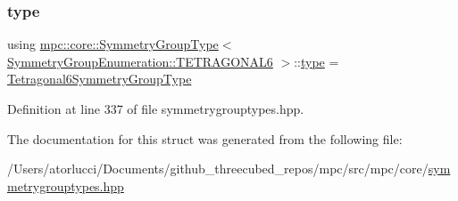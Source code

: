 \subsubsection{\texorpdfstring{type}{type}}
{\footnotesize\ttfamily using \mbox{\hyperlink{structmpc_1_1core_1_1_symmetry_group_type}{mpc\+::core\+::\+Symmetry\+Group\+Type}}$<$ \mbox{\hyperlink{namespacempc_1_1core_a9d979684062547055a0ef5c13077bad8a63dabd41a700b44f934a19db4e0f8f83}{Symmetry\+Group\+Enumeration\+::\+T\+E\+T\+R\+A\+G\+O\+N\+A\+L6}} $>$\+::\mbox{\hyperlink{structmpc_1_1core_1_1_symmetry_group_type_3_01_symmetry_group_enumeration_1_1_t_e_t_r_a_g_o_n_a_l6_01_4_a5a59ef59ad26662e942639a2243dc2e7}{type}} =  \mbox{\hyperlink{structmpc_1_1core_1_1_tetragonal6_symmetry_group_type}{Tetragonal6\+Symmetry\+Group\+Type}}}



Definition at line 337 of file symmetrygrouptypes.\+hpp.



The documentation for this struct was generated from the following file\+:\begin{DoxyCompactItemize}
\item 
/\+Users/atorlucci/\+Documents/github\+\_\+threecubed\+\_\+repos/mpc/src/mpc/core/\mbox{\hyperlink{symmetrygrouptypes_8hpp}{symmetrygrouptypes.\+hpp}}\end{DoxyCompactItemize}
